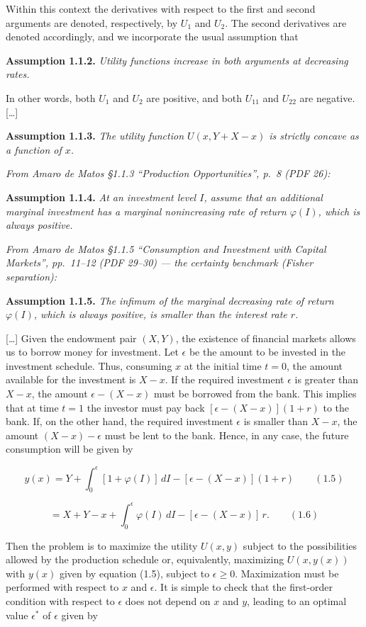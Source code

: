 \documentclass[11pt,a4paper]{article}
\numberwithin{equation}{section}
\begin{document}
Within this context the derivatives with respect to the first and second arguments are denoted,
respectively, by \(U_1\) and \(U_2\). The second derivatives are denoted accordingly, and we
incorporate the usual assumption that

\textbf{Assumption 1.1.2.} \emph{Utility functions increase in both arguments at decreasing rates.}

In other words, both \(U_1\) and \(U_2\) are positive, and both \(U_{11}\) and \(U_{22}\) are
negative. {[}\ldots{]}

\textbf{Assumption 1.1.3.} \emph{The utility function \(U(x, Y + X - x)\) is strictly concave as a
function of \(x\).}

\emph{From Amaro de Matos §1.1.3 ``Production Opportunities'', p.~8 (PDF 26):}

\textbf{Assumption 1.1.4.} \emph{At an investment level \(I\), assume that an additional marginal
investment has a marginal nonincreasing rate of return \(\varphi(I)\), which is always positive.}

\emph{From Amaro de Matos §1.1.5 ``Consumption and Investment with Capital Markets'', pp.~11--12
(PDF 29--30) --- the certainty benchmark (Fisher separation):}

\textbf{Assumption 1.1.5.} \emph{The infimum of the marginal decreasing rate of return
\(\varphi(I)\), which is always positive, is smaller than the interest rate \(r\).}

{[}\ldots{]} Given the endowment pair \((X, Y)\), the existence of financial markets allows us to
borrow money for investment. Let \(\epsilon\) be the amount to be invested in the investment
schedule. Thus, consuming \(x\) at the initial time \(t = 0\), the amount available for the
investment is \(X - x\). If the required investment \(\epsilon\) is greater than \(X - x\), the
amount \(\epsilon - (X - x)\) must be borrowed from the bank. This implies that at time \(t = 1\)
the investor must pay back \([\epsilon - (X - x)](1 + r)\) to the bank. If, on the other hand, the
required investment \(\epsilon\) is smaller than \(X - x\), the amount \((X - x) - \epsilon\) must
be lent to the bank. Hence, in any case, the future consumption will be given by

\[y(x) = Y + \int_0^{\epsilon} [1 + \varphi(I)]\, dI - [\epsilon - (X - x)](1 + r) \qquad (1.5)\]

\[= X + Y - x + \int_0^{\epsilon} \varphi(I)\, dI - [\epsilon - (X - x)]\, r. \qquad (1.6)\]

Then the problem is to maximize the utility \(U(x, y)\) subject to the possibilities allowed by the
production schedule or, equivalently, maximizing \(U(x, y(x))\) with \(y(x)\) given by equation
(1.5), subject to \(\epsilon \ge 0\). Maximization must be performed with respect to \(x\) and
\(\epsilon\). It is simple to check that the first-order condition with respect to \(\epsilon\) does
not depend on \(x\) and \(y\), leading to an optimal value \(\epsilon^*\) of \(\epsilon\) given by
\end{document}

